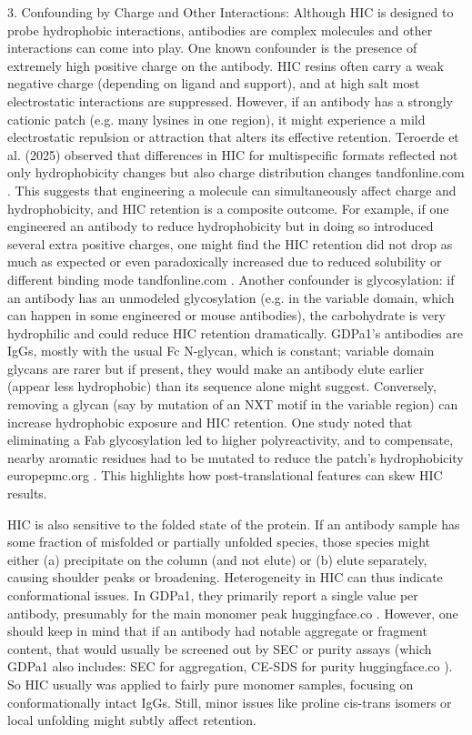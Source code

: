 \documentclass[12pt]{article}
\begin{document}
3. Confounding by Charge and Other Interactions: Although HIC is designed to probe hydrophobic interactions, antibodies are complex molecules and other interactions can come into play. One known confounder is the presence of extremely high positive charge on the antibody. HIC resins often carry a weak negative charge (depending on ligand and support), and at high salt most electrostatic interactions are suppressed. However, if an antibody has a strongly cationic patch (e.g. many lysines in one region), it might experience a mild electrostatic repulsion or attraction that alters its effective retention. Teroerde et al. (2025) observed that differences in HIC for multispecific formats reflected not only hydrophobicity changes but also charge distribution changes
tandfonline.com
. This suggests that engineering a molecule can simultaneously affect charge and hydrophobicity, and HIC retention is a composite outcome. For example, if one engineered an antibody to reduce hydrophobicity but in doing so introduced several extra positive charges, one might find the HIC retention did not drop as much as expected or even paradoxically increased due to reduced solubility or different binding mode
tandfonline.com
. Another confounder is glycosylation: if an antibody has an unmodeled glycosylation (e.g. in the variable domain, which can happen in some engineered or mouse antibodies), the carbohydrate is very hydrophilic and could reduce HIC retention dramatically. GDPa1’s antibodies are IgGs, mostly with the usual Fc N-glycan, which is constant; variable domain glycans are rarer but if present, they would make an antibody elute earlier (appear less hydrophobic) than its sequence alone might suggest. Conversely, removing a glycan (say by mutation of an NXT motif in the variable region) can increase hydrophobic exposure and HIC retention. One study noted that eliminating a Fab glycosylation led to higher polyreactivity, and to compensate, nearby aromatic residues had to be mutated to reduce the patch’s hydrophobicity
europepmc.org
. This highlights how post-translational features can skew HIC results.

HIC is also sensitive to the folded state of the protein. If an antibody sample has some fraction of misfolded or partially unfolded species, those species might either (a) precipitate on the column (and not elute) or (b) elute separately, causing shoulder peaks or broadening. Heterogeneity in HIC can thus indicate conformational issues. In GDPa1, they primarily report a single value per antibody, presumably for the main monomer peak
huggingface.co
. However, one should keep in mind that if an antibody had notable aggregate or fragment content, that would usually be screened out by SEC or purity assays (which GDPa1 also includes: SEC for aggregation, CE-SDS for purity
huggingface.co
). So HIC usually was applied to fairly pure monomer samples, focusing on conformationally intact IgGs. Still, minor issues like proline cis-trans isomers or local unfolding might subtly affect retention.
\end{document}
